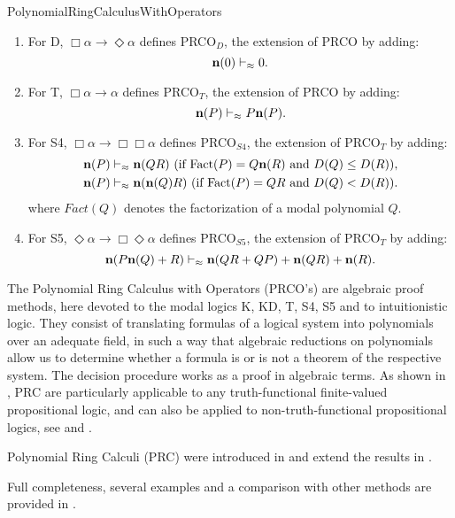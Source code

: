 \begin{entry}{PolynomialRingCalculusWithOperators}
\begin{calculus}
\begin{enumerate}
\item  For D, $\Box\alpha \to \Diamond \alpha $ defines  PRCO$_{D}$,  the extension of PRCO   by adding:
 \begin{equation*}
	 \textbf{n}(0) \vdash_{\approx} 0 . 
 \end{equation*}
\item 	For T, $\Box\alpha \to \alpha$ defines PRCO$_{T}$,  the extension of PRCO  by adding:
\begin{equation*}
	\textbf{n}(P) \vdash_{\approx} P \textbf{n}(P).
\end{equation*}
\item For S4, $\Box\alpha \to \Box\Box\alpha$  defines PRCO$_{S4}$, the extension of  PRCO$_T$   by adding:
\begin{align*}
	&\textbf{n}(P) \vdash_{\approx} \textbf{n}(QR) \mbox{ (if $\mbox{Fact}(P) = Q \textbf{n}(R)$ and $D(Q) \leq D(R)$)},   \\ 
	&\textbf{n}(P) \vdash_{\approx} \textbf{n}(\textbf{n}(Q)R) \mbox{ (if $\mbox{Fact}(P) = Q R$ and $D(Q) < D(R)$)}.  
 \end{align*} 
  where $Fact(Q)$ denotes the factorization of a modal polynomial $Q$.
	\item For  S5, $\Diamond\alpha \to \Box\Diamond\alpha$ defines  PRCO$_{S5}$, the extension of  PRCO$_T$   by adding:
\begin{equation*}
	\textbf{n}(P \textbf{n}(Q) + R) \vdash_{\approx} \textbf{n}(Q R + Q P) + \textbf{n}(Q R) + \textbf{n}(R). 
\end{equation*}
\end{enumerate}

\end{calculus}


\begin{clarifications}
The Polynomial Ring Calculus with Operators (PRCO's) are algebraic proof methods,  
here devoted to the modal logics K, KD, T, S4, S5 and to intuitionistic logic. 
They consist of translating formulas of a logical system into polynomials 
over an adequate field, in such a way that algebraic reductions on polynomials
allow us to determine whether a formula is or is not a theorem of the respective
system. The decision procedure works as a proof in algebraic  terms. As shown in  \cite{car:2005}, 
PRC are particularly applicable to any truth-functional finite-valued propositional logic,
and can also be applied to non-truth-functional propositional logics, see
\cite{car-mat:2014} and \cite{car-mat:2015}.
\end{clarifications}

\begin{history}
Polynomial Ring Calculi (PRC) were introduced in \cite{car:2005} and extend
the results in \cite{agude-car:2011}.  
 \end{history}

\begin{technicalities}
Full completeness, several examples and a comparison with other methods are provided in 
\cite{agude-car:2015}.  
\end{technicalities}


\end{entry}